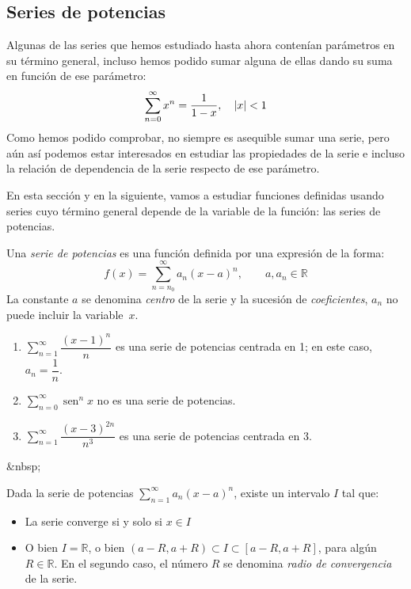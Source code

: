 \subsection{Series de potencias} 

Algunas de las series que hemos estudiado hasta ahora contenían parámetros en su término general, incluso hemos podido sumar alguna de ellas dando su suma en función de ese parámetro:
\[
\displaystyle\sum_{n=0}^\infty   x^n =\frac1{1-x}, \quad |x|< 1
\]
Como hemos podido comprobar, no siempre es asequible sumar una serie, pero aún así podemos estar interesados en estudiar las propiedades de la serie e incluso la relación de dependencia de la serie respecto de ese parámetro.

En esta sección y en la siguiente, vamos a estudiar funciones definidas usando series cuyo término general depende de la variable de la función: las series de potencias.
%
\begin{definicion}
Una \emph{serie de potencias} es una función definida por una expresión de la forma:
\[
f(x)=\sum_{n=n_0}^\infty a_n(x-a)^n,\qquad a,a_n\in\mathbb{R}
\]
%
La constante $a$ se denomina \emph{centro} de la serie y la sucesión de \emph{coeficientes},
$a_n$ no puede incluir la variable~$x$.
\end{definicion}
%
\begin{ejemplo}\rule{0pt}{0pt}
\begin{enumerate}
\item
$\displaystyle\sum_{n=1}^\infty   \dfrac{(x-1)^n}n$ es una serie de potencias centrada en 1; en este caso,~$a_n=\dfrac1n$.
\item
$\displaystyle\sum_{n=0}^\infty   \operatorname{sen}^nx$ no es una serie de potencias.
\item
$\displaystyle\sum_{n=1}^\infty   \dfrac{(x-3)^{2n}}{n^3}$ es una serie de potencias centrada en 3.\fej
\end{enumerate}
\end{ejemplo}
\begin{rawhtml}
&nbsp;
\end{rawhtml}
\begin{teorema}
Dada la serie de potencias $\displaystyle\sum_{n=1}^\infty  a_n(x-a)^n$, existe un intervalo $I$ tal que:
\begin{itemize}
\item
La serie converge si y solo si $x\in I$
\item
O bien $I=\mathbb{R}$, o bien $(a-R,a+R)\subset I\subset [a-R,a+R]$, para algún $R\in\mathbb{R}$.
En el segundo caso, el número $R$ se denomina \emph{radio de convergencia} de la serie.
\end{itemize}
\end{teorema}

